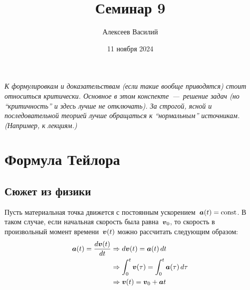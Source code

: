 \documentclass[a4paper,12pt]{article}
\author{Алексеев Василий}
\title{Семинар 9}
\date{11 ноября 2024}
\newcommand{\diff}{\mathop{}\!d}
\begin{document}
  \maketitle
  
  \tableofcontents

  \thispagestyle{empty}
  
  \newpage
  
  
  
  \vspace*{\fill}
  
  \noindent
  \emph{
    К формулировкам и доказательствам (если такие вообще приводятся) стоит относиться критически.
    Основное в этом конспекте~---~решение задач (но ``критичность'' и здесь лучше не отключать).
    За строгой, ясной и последовательной теорией лучше обращаться к ``нормальным'' источникам.
    (Например, к лекциям.)
  }
  
  \vspace*{\fill}
  
  \thispagestyle{empty}
  
  \newpage
  
  


  \section{Формула Тейлора}
  
  
  


  \subsection{Сюжет из физики}

  Пусть материальная точка движется с постоянным ускорением~$\bds a(t) \hm= \text{const}$.
  В таком случае, если начальная скорость была равна~$\boldsymbol v_0$, то скорость в произвольный момент времени~$\boldsymbol v(t)$ можно рассчитать следующим образом:
  \begin{equation*}
  \begin{split}
    \bds a(t) = \frac{\diff \bds v(t)}{\diff t} &\Rightarrow \diff \bds v(t) = \bds a(t) \diff t\\
    &\Rightarrow \int_0^t \bds v(\tau) = \int_0^t \bds a(\tau) \diff \tau\\
    &\Rightarrow \bds v(t) = \bds v_0 + \bds a t
  \end{split}
  \end{equation*}
\end{document}
